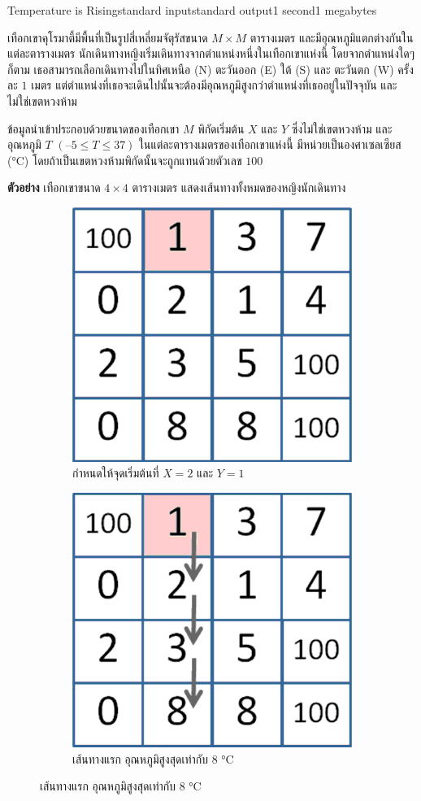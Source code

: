 \documentclass[11pt,a4paper]{article}
\begin{document}
\begin{problem}{Temperature is Rising}{standard input}{standard output}{1 second}{1 megabytes}

เทือกเขาคุโรมาตี้มีพื้นที่เป็นรูปสี่เหลี่ยมจัตุรัสขนาด $M \times M$ ตารางเมตร และมีอุณหภูมิแตกต่างกันในแต่ละตารางเมตร นักเดินทางหญิงเริ่มเดินทางจากตำแหน่งหนึ่งในเทือกเขาแห่งนี้ โดยจากตำแหน่งใดๆ ก็ตาม เธอสามารถเลือกเดินทางไปในทิศเหนือ (N) ตะวันออก (E) ใต้ (S) และ ตะวันตก (W) ครั้งละ $1$ เมตร แต่ตำแหน่งที่เธอจะเดินไปนั้นจะต้องมีอุณหภูมิสูงกว่าตำแหน่งที่เธออยู่ในปัจจุบัน และไม่ใช่เขตหวงห้าม

ข้อมูลนำเข้าประกอบด้วยขนาดของเทือกเขา $M$ พิกัดเริ่มต้น $X$ และ $Y$ ซึ่งไม่ใช่เขตหวงห้าม และอุณหภูมิ $T$ $(–5 \leq T \leq 37)$ ในแต่ละตารางเมตรของเทือกเขาแห่งนี้ มีหน่วยเป็นองศาเซลเซียส (°C) โดยถ้าเป็นเขตหวงห้ามพิกัดนั้นจะถูกแทนด้วยตัวเลข $100$
\bigskip

\textbf{ตัวอย่าง} เทือกเขาขนาด $4 \times 4$ ตารางเมตร แสดงเส้นทางทั้งหมดของหญิงนักเดินทาง


\begin{figure}[h]
\centering
\begin{subfigure}{40ex}
\centering
\includegraphics[width=25ex]{../latex/img/1061/1061-1.png}
\caption*{กำหนดให้จุดเริ่มต้นที่ $X = 2$ และ $Y = 1$}
\end{subfigure}%
\begin{subfigure}{40ex}
\centering
\includegraphics[width=25ex]{../latex/img/1061/1061-2.png}
\caption*{เส้นทางแรก อุณหภูมิสูงสุดเท่ากับ $8$ °C}
\end{subfigure}%

\end{figure}



\end{problem}
\end{document}
